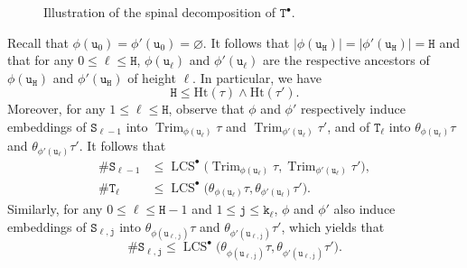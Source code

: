 \documentclass[11pt,reqno]{amsart}
\newcommand{\1}{\mathbf{1}}
\newcommand{\0}{\mathbf{0}}
\newcommand{\ttS}{\mathtt{S}}
\newcommand{\ttT}{\mathtt{T}}
\newcommand{\ttH}{\mathtt{H}}
\newcommand{\ttj}{\mathtt{j}}
\newcommand{\ttk}{\mathtt{k}}
\newcommand{\ttu}{\mathtt{u}}
\newcommand{\Ht}{\mathrm{Ht}}
\newcommand{\Trim}{\operatorname{Trim}}
\newcommand{\LCS}{\operatorname{LCS}}
\begin{document}
\begin{figure}
\begin{tikzpicture}[x=0.75pt,y=0.75pt,yscale=1,xscale=1]
\end{tikzpicture}

    \caption{Illustration of the spinal decomposition of $\ttT^\bullet$.}
    \label{fig:Tdot-spine}
\end{figure}


Recall that $\phi(\ttu_0)=\phi'(\ttu_0)=\varnothing$. It follows that $|\phi(\ttu_{\ttH})|=|\phi'(\ttu_{\ttH})|=\ttH$ and that for any $0\leq \ell\leq \ttH$, $\phi(\ttu_\ell)$ and $\phi'(\ttu_\ell)$ are the respective ancestors of $\phi(\ttu_{\ttH})$ and $\phi'(\ttu_{\ttH})$ of height $\ell$. In particular, we have
\begin{equation}
\label{height_LCS_vs_MIN}
\ttH\leq \Ht(\tau) \wedge \Ht(\tau').
\end{equation}
Moreover, for any $1\leq \ell\leq \ttH$, observe that $\phi$ and $\phi'$ respectively induce embeddings of $\ttS_{\ell-1}$ into $\Trim_{\phi(\ttu_\ell)}\tau$ and $\Trim_{\phi'(\ttu_\ell)}\tau'$, and of $\ttT_{\ell}$ into $\theta_{\phi(\ttu_\ell)}\tau$ and $\theta_{\phi'(\ttu_\ell)}\tau'$. It follows that
\begin{align}
\label{spinal_LCS}
\#\ttS_{\ell-1}&\leq \LCS^\bullet\big(\Trim_{\phi(\ttu_\ell)}\tau,\Trim_{\phi'(\ttu_\ell)}\tau'\big),\\
\label{spinal_above_LCS}
\#\ttT_{\ell}&\leq \LCS^\bullet\big(\theta_{\phi(\ttu_\ell)}\tau,\theta_{\phi'(\ttu_\ell)}\tau'\big).
\end{align}
Similarly, for any $0\leq\ell\leq \ttH-1$ and $1\leq \ttj\leq \ttk_{\ell}$, $\phi$ and $\phi'$ also induce embeddings of $\ttS_{\ell,\ttj}$ into $\theta_{\phi(\ttu_{\ell,\ttj})}\tau$ and $\theta_{\phi'(\ttu_{\ell,\ttj})}\tau'$, which yields that
\begin{equation}
\label{spinal_compo_LCS}
\#\ttS_{\ell,\ttj}\leq \LCS^\bullet\big(\theta_{\phi(\ttu_{\ell,\ttj})}\tau,\theta_{\phi'(\ttu_{\ell,\ttj})}\tau'\big).
\end{equation}
\smallskip
\end{document}
